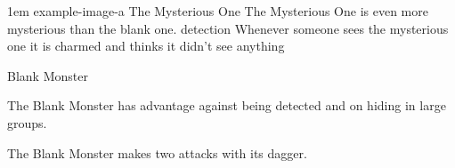 \documentclass[letterpaper,openany,oneside,twocolumn]{book}
\begin{document}
\vfill\eject %

\MonsterVariant%
	{1em}%
	{example-image-a}%
	{The Mysterious One}%
	{%
		The Mysterious One is even more mysterious than the blank one.
		detection
		Whenever someone sees the mysterious one it is charmed and thinks it didn't see anything
	}%

\begin{DndMonster}[width=0.5\textwidth]{Blank Monster}

    \DndMonsterBasics[
        armor-class = {10},
        hit-points  = {\DndDice{1d12 + 6}},
        speed       = {30 ft., climb 25 ft.},
    ]

    \DndMonsterAbilityScores[
    ]

    \DndMonsterDetails[
        challenge = 1,
    ]
    
    The Blank Monster has advantage against being detected and on hiding in large groups.
	
	The Blank Monster makes two attacks with its dagger.
	
	\DndMonsterAttack[
      name=Dagger,
      distance=melee, %
      mod=+3,
      reach=10,
      targets=one target,
      dmg=\DndDice{1d8 + 2},
      dmg-type=slashing,
    ]
      
\end{DndMonster}
\end{document}
